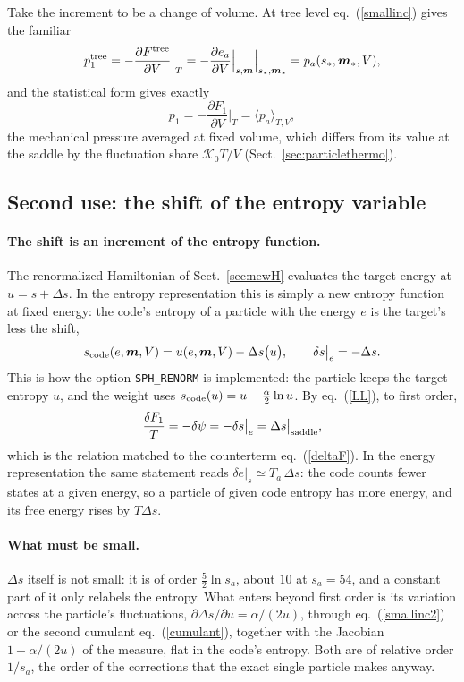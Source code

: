\documentclass[11pt,aps,preprint,nofootinbib,superscriptaddress,tightenlines]{revtex4-2}
\newcommand{\avg}[1]{\langle #1\rangle}
\def\st{\begin{equation}}
\def\stp{\end{equation}}
\def\Eq#1{eq.~(\ref{#1})}
\def\Sect#1{Sect.~\ref{#1}}
\let\oldparagraph\paragraph
\renewcommand{\paragraph}{\par\bigskip\oldparagraph}
\begin{document}
Take the increment to be a change of volume.  At tree level \Eq{smallinc} gives the familiar
\st
p_1^{\rm tree}=-\frac{\partial F^{\rm tree}}{\partial V}\Big|_T=-\frac{\partial e_a}{\partial V}\Big|_{s,\bm m}\Big|_{s_*,\bm m_*}=p_a(s_*,\bm m_*,V) ,
\stp
and the statistical form gives exactly
\st
p_1=-\frac{\partial F_1}{\partial V}\Big|_T=\avg{p_a}_{T,V} ,
\stp
the mechanical pressure averaged at fixed volume, which differs from its value at the saddle by the fluctuation share $\mathcal K_0T/V$ (\Sect{sec:particlethermo}).

\subsection{Second use: the shift of the entropy variable}
\label{app:smallinc_shift}

\paragraph{The shift is an increment of the entropy function.}  The renormalized Hamiltonian of \Sect{sec:newH} evaluates the target energy at $u=s+\Delta s$.  In the
entropy representation this is simply a new entropy function at fixed energy: the code's entropy of a particle with the energy $e$ is the target's less the shift,
\st
s_{\rm code}(e,\bm m,V)=u(e,\bm m,V)-\Delta s\big(u\big),\qquad \delta s\big|_{e}=-\Delta s .
\stp
This is how the option \texttt{SPH\_RENORM} is implemented: the particle keeps the target entropy $u$, and the weight uses $s_{\rm code}(u)=u-\tfrac\alpha2\ln u$.  By \Eq{LL},
to first order,
\st
\frac{\delta F_1}T=-\delta\psi=-\delta s\big|_e=\Delta s\big|_{\rm saddle} ,
\stp
which is the relation matched to the counterterm \Eq{deltaF}.  In the energy representation the same statement reads $\delta e|_s\simeq T_a\,\Delta s$: the code counts fewer
states at a given energy, so a particle of given code entropy has more energy, and its free energy rises by $T\Delta s$.

\paragraph{What must be small.}  $\Delta s$ itself is not small: it is of order $\tfrac52\ln s_a$, about $10$ at $s_a=54$, and a constant part of it only relabels the entropy.
What enters beyond first order is its variation across the particle's fluctuations, $\partial\Delta s/\partial u=\alpha/(2u)$, through \Eq{smallinc2} or the second cumulant
\Eq{cumulant}, together with the Jacobian $1-\alpha/(2u)$ of the measure, flat in the code's entropy.  Both are of relative order $1/s_a$, the order of the corrections
that the exact single particle makes anyway.
\end{document}
